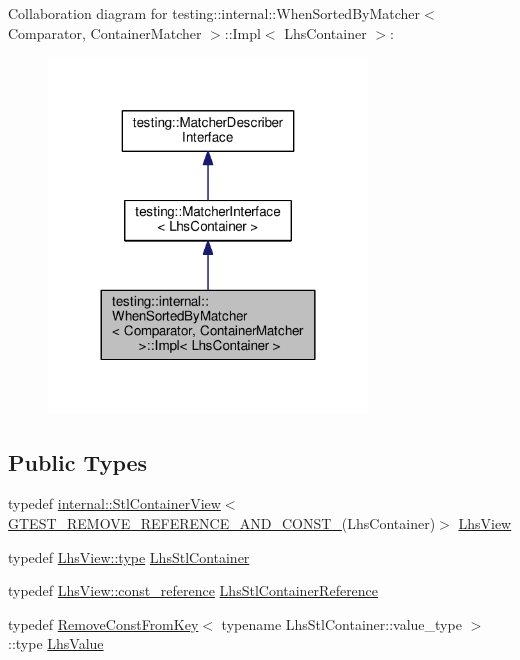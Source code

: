 Collaboration diagram for testing\+:\+:internal\+:\+:When\+Sorted\+By\+Matcher$<$ Comparator, Container\+Matcher $>$\+:\+:Impl$<$ Lhs\+Container $>$\+:\nopagebreak
\begin{figure}[H]
\begin{center}
\leavevmode
\includegraphics[width=240pt]{classtesting_1_1internal_1_1WhenSortedByMatcher_1_1Impl__coll__graph}
\end{center}
\end{figure}
\subsection*{Public Types}
\begin{DoxyCompactItemize}
\item 
typedef \hyperlink{classtesting_1_1internal_1_1StlContainerView}{internal\+::\+Stl\+Container\+View}$<$ \hyperlink{gtest-internal_8h_a874567b176266188fabfffb8393267ce}{G\+T\+E\+S\+T\+\_\+\+R\+E\+M\+O\+V\+E\+\_\+\+R\+E\+F\+E\+R\+E\+N\+C\+E\+\_\+\+A\+N\+D\+\_\+\+C\+O\+N\+S\+T\+\_\+}(Lhs\+Container)$>$ \hyperlink{classtesting_1_1internal_1_1WhenSortedByMatcher_1_1Impl_a4c84fddfe1bf967a73e5dae1940db427}{Lhs\+View}
\item 
typedef \hyperlink{classtesting_1_1internal_1_1StlContainerView_a2b2c63a6dcdbfe63fb0ee121ebf463ba}{Lhs\+View\+::type} \hyperlink{classtesting_1_1internal_1_1WhenSortedByMatcher_1_1Impl_a2cb1a8d85ca2c376b6abdbcb00d84759}{Lhs\+Stl\+Container}
\item 
typedef \hyperlink{classtesting_1_1internal_1_1StlContainerView_a9cd4f6ed689b3938cdb7b3c4cbf1b36b}{Lhs\+View\+::const\+\_\+reference} \hyperlink{classtesting_1_1internal_1_1WhenSortedByMatcher_1_1Impl_ab5e53a762bb213ccf84299b31c825b58}{Lhs\+Stl\+Container\+Reference}
\item 
typedef \hyperlink{structtesting_1_1internal_1_1RemoveConstFromKey}{Remove\+Const\+From\+Key}$<$ typename Lhs\+Stl\+Container\+::value\+\_\+type $>$\+::type \hyperlink{classtesting_1_1internal_1_1WhenSortedByMatcher_1_1Impl_a93044f4ba53373fcfc424132b5e6c462}{Lhs\+Value}
\end{DoxyCompactItemize}
